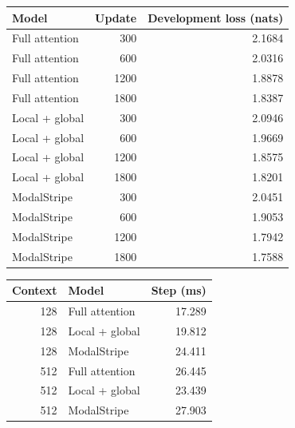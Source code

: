 \documentclass[11pt,letterpaper]{article}
\begin{document}
\begin{center}\begin{minipage}{\textwidth}\centering\small
{}

\begin{tabular}{lrr}\toprule
Model & Update & Development loss (nats)\\\midrule
Full attention & 300 & 2.1684 \\
Full attention & 600 & 2.0316 \\
Full attention & 1200 & 1.8878 \\
Full attention & 1800 & 1.8387 \\
Local + global & 300 & 2.0946 \\
Local + global & 600 & 1.9669 \\
Local + global & 1200 & 1.8575 \\
Local + global & 1800 & 1.8201 \\
ModalStripe & 300 & 2.0451 \\
ModalStripe & 600 & 1.9053 \\
ModalStripe & 1200 & 1.7942 \\
ModalStripe & 1800 & 1.7588 \\
\bottomrule\end{tabular}


\end{minipage}\end{center}

\begin{center}\begin{minipage}{\textwidth}\centering\small
{}

\begin{tabular}{rlr}\toprule
Context & Model & Step (ms)\\\midrule
128 & Full attention & 17.289 \\
128 & Local + global & 19.812 \\
128 & ModalStripe & 24.411 \\
512 & Full attention & 26.445 \\
512 & Local + global & 23.439 \\
512 & ModalStripe & 27.903 \\
\bottomrule\end{tabular}


\end{minipage}\end{center}
\end{document}
